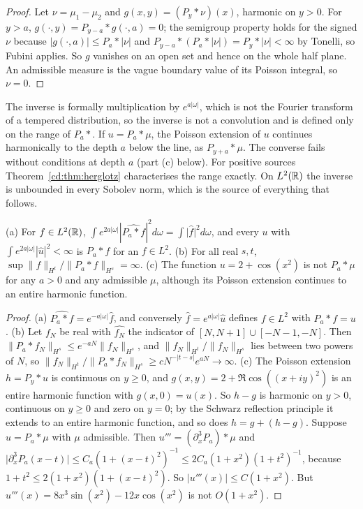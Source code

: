 \begin{proof}
Let $\nu=\mu_1-\mu_2$ and $g(x,y)=(P_y*\nu)(x)$, harmonic on $y>0$. For $y>a$, $g(\cdot,y)=P_{y-a}*g(\cdot,a)=0$; the semigroup property holds for the signed $\nu$ because $\lvert g(\cdot,a)\rvert\le P_a*\lvert\nu\rvert$ and $P_{y-a}*(P_a*\lvert\nu\rvert)=P_y*\lvert\nu\rvert<\infty$ by Tonelli, so Fubini applies. So $g$ vanishes on an open set and hence on the whole half plane. An admissible measure is the vague boundary value of its Poisson integral, so $\nu=0$.
\end{proof}

The inverse is formally multiplication by $e^{a|\omega|}$, which is not the Fourier transform of a tempered distribution, so the inverse is not a convolution and is defined only on the range of $P_a*$. If $u=P_a*\mu$, the Poisson extension of $u$ continues harmonically to the depth $a$ below the line, as $P_{y+a}*\mu$. The converse fails without conditions at depth $a$ (part (c) below). For positive sources Theorem~\ref{cd:thm:herglotz} characterises the range exactly. On $L^2(\mathbb{R})$ the inverse is unbounded in every Sobolev norm, which is the source of everything that follows.

\begin{proposition}\label{cd:prop:range}
(a) For $f\in L^2(\mathbb{R})$, $\int e^{2a|\omega|}|\widehat{P_a*f}|^2d\omega=\int\lvert\widehat f\rvert^2d\omega$, and every $u$ with $\int e^{2a|\omega|}|\widehat u|^2<\infty$ is $P_a*f$ for an $f\in L^2$. (b) For all real $s,t$, $\sup\|f\|_{H^t}/\|P_a*f\|_{H^s}=\infty$. (c) The function $u=2+\cos(x^2)$ is not $P_a*\mu$ for any $a>0$ and any admissible $\mu$, although its Poisson extension continues to an entire harmonic function.
\end{proposition}

\begin{proof}
(a) $\widehat{P_a*f}=e^{-a|\omega|}\widehat f$, and conversely $\widehat f=e^{a|\omega|}\widehat u$ defines $f\in L^2$ with $P_a*f=u$. (b) Let $f_N$ be real with $\widehat{f_N}$ the indicator of $[N,N+1]\cup[-N-1,-N]$. Then $\|P_a*f_N\|_{H^s}\le e^{-aN}\|f_N\|_{H^s}$, and $\|f_N\|_{H^t}/\|f_N\|_{H^s}$ lies between two powers of $N$, so $\|f_N\|_{H^t}/\|P_a*f_N\|_{H^s}\ge cN^{-|t-s|}e^{aN}\to\infty$. (c) The Poisson extension $h=P_y*u$ is continuous on $y\ge0$, and $g(x,y)=2+\Re\cos((x+iy)^2)$ is an entire harmonic function with $g(x,0)=u(x)$. So $h-g$ is harmonic on $y>0$, continuous on $y\ge0$ and zero on $y=0$; by the Schwarz reflection principle it extends to an entire harmonic function, and so does $h=g+(h-g)$. Suppose $u=P_a*\mu$ with $\mu$ admissible. Then $u'''=(\partial_x^3P_a)*\mu$ and $\lvert\partial_x^3P_a(x-t)\rvert\le C_a(1+(x-t)^2)^{-1}\le2C_a(1+x^2)(1+t^2)^{-1}$, because $1+t^2\le2(1+x^2)(1+(x-t)^2)$. So $\lvert u'''(x)\rvert\le C(1+x^2)$. But $u'''(x)=8x^3\sin(x^2)-12x\cos(x^2)$ is not $O(1+x^2)$.
\end{proof}

